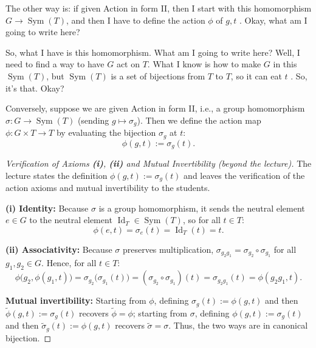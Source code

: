 \begin{proofWrapper}
\begin{speech}[01:09:55 - 01:10:49]
The other way is: if given Action in form II, then I start with this homomorphism $G \to \operatorname{Sym}(T)$, and then I have to define the action $\phi$ of $g, t$ . Okay, what am I going to write here? 

So, what I have is this homomorphism. What am I going to write here? Well, I need to find a way to have $G$ act on $T$. What I know is how to make $G$ in this $\operatorname{Sym}(T)$, but $\operatorname{Sym}(T)$ is a set of bijections from $T$ to $T$, so it can eat $t$ . So, it's that. Okay?
\end{speech}

\begin{content}
Conversely, suppose we are given Action in form II, i.e., a group homomorphism $\sigma \colon G \to \operatorname{Sym}(T)$ (sending $g \mapsto \sigma_g$). Then we define the action map $\phi \colon G \times T \to T$ by evaluating the bijection $\sigma_g$ at $t$:
\[
\phi(g, t) := \sigma_g(t).
\]

\begin{proof}[Verification of Axioms \textbf{(i)}, \textbf{(ii)} and Mutual Invertibility (beyond the lecture)]
The lecture states the definition $\phi(g, t) := \sigma_g(t)$ and leaves the verification of the action axioms and mutual invertibility to the students.

\textbf{(i) Identity:} Because $\sigma$ is a group homomorphism, it sends the neutral element $e \in G$ to the neutral element $\operatorname{Id}_T \in \operatorname{Sym}(T)$, so for all $t \in T$:
\[
\phi(e, t) = \sigma_e(t) = \operatorname{Id}_T(t) = t.
\]

\textbf{(ii) Associativity:} Because $\sigma$ preserves multiplication, $\sigma_{g_2 g_1} = \sigma_{g_2} \circ \sigma_{g_1}$ for all $g_1, g_2 \in G$. Hence, for all $t \in T$:
\[
\phi\bigl(g_2, \phi(g_1, t)\bigr) = \sigma_{g_2}\bigl(\sigma_{g_1}(t)\bigr) = (\sigma_{g_2} \circ \sigma_{g_1})(t) = \sigma_{g_2 g_1}(t) = \phi(g_2 g_1, t).
\]

\textbf{Mutual invertibility:} Starting from $\phi$, defining $\sigma_g(t) := \phi(g, t)$ and then $\tilde{\phi}(g, t) := \sigma_g(t)$ recovers $\tilde{\phi} = \phi$; starting from $\sigma$, defining $\phi(g, t) := \sigma_g(t)$ and then $\tilde{\sigma}_g(t) := \phi(g, t)$ recovers $\tilde{\sigma} = \sigma$. Thus, the two ways are in canonical bijection.
\end{proof}
\end{content}

\end{proofWrapper}


